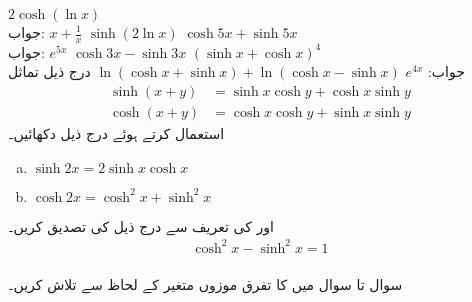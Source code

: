 $2\cosh(\ln x)$\\
جواب:\quad
$x+\tfrac{1}{x}$
$\sinh(2\ln x)$
$\cosh 5x+\sinh 5x$\\
جواب:\quad
$e^{5x}$
$\cosh 3x-\sinh 3x$
$(\sinh x+\cosh x)^4$\\
جواب:\quad
$e^{4x}$
$\ln(\cosh x+\sinh x)+\ln(\cosh x-\sinh x)$
درج ذیل تماثل
\begin{align*}
\sinh(x+y)&=\sinh x\cosh y+\cosh x\sinh y\\
\cosh(x+y)&=\cosh x\cosh y+\sinh x\sinh y
\end{align*}
استعمال کرتے ہوئے درج ذیل دکھائیں۔
\begin{enumerate}[a.]
\item
$\sinh 2x=2\sinh x\cosh x$
\item
$\cosh 2x=\cosh^2x+\sinh^2x$
\end{enumerate}
 اور  کی تعریف سے درج ذیل کی تصدیق کریں۔
\begin{align*}
\cosh^2x-\sinh^2x=1
\end{align*}
\\
سوال  تا سوال  میں  کا تفرق موزوں متغیر کے لحاظ سے تلاش کریں۔


